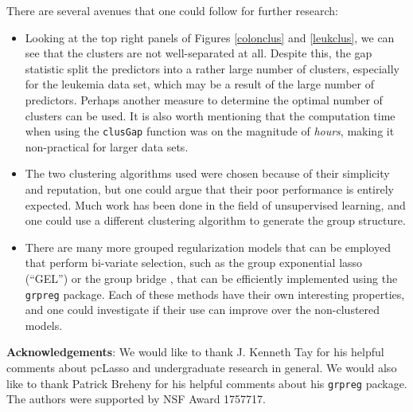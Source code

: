 \documentclass[11pt]{article}
\begin{document}
There are several avenues that one could follow for further research:
\begin{itemize}
    \item Looking at the top right panels of Figures \ref{colonclus} and \ref{leukclus}, we can see that the clusters are not well-separated at all. Despite this, the gap statistic split the predictors into a rather large number of clusters, especially for the leukemia data set, which may be a result of the large number of predictors. Perhaps another measure to determine the optimal number of clusters can be used. It is also worth mentioning that the computation time when using the \texttt{clusGap} function was on the magnitude of \textit{hours}, making it non-practical for larger data sets.
    \item The two clustering algorithms used were chosen because of their simplicity and reputation, but one could argue that their poor performance is entirely expected. Much work has been done in the field of unsupervised learning, and one could use a different clustering algorithm to generate the group structure.
    \item There are many more grouped regularization models that can be employed that perform bi-variate selection, such as the group exponential lasso (``GEL'') \cite{Breheny2015TheGE} or the group bridge \cite{huang2009group}, that can be efficiently implemented using the \texttt{grpreg} package. Each of these methods have their own interesting properties, and one could investigate if their use can improve over the non-clustered models.
\end{itemize}

\textbf{Acknowledgements}: We would like to thank J. Kenneth Tay for his helpful comments about pcLasso and undergraduate research in general. We would also like to thank Patrick Breheny for his helpful comments about his \texttt{grpreg} package. The authors were supported by NSF Award 1757717.











\end{document}
